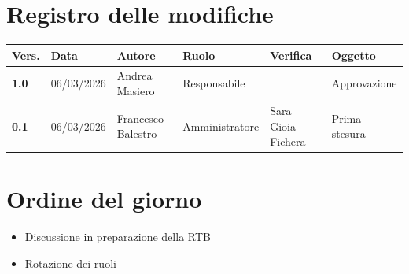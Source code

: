 \documentclass[a4paper,12pt]{article}
\begin{document}
    

    \newpage
    \section*{Registro delle modifiche}

    \begin{table}[h!]
        \begin{tabularx}{\textwidth}{|l|l|l|l|X|X|}
            \hline
            \textbf{Vers.} & \textbf{Data} & \textbf{Autore} & \textbf{Ruolo} & \textbf{Verifica} & \textbf{Oggetto} \\
            \hline
            \textbf{1.0} & 06/03/2026 & Andrea Masiero & Responsabile &  & Approvazione \\
            \hline
            \textbf{0.1} & 06/03/2026 & Francesco Balestro & Amministratore & Sara Gioia Fichera & Prima stesura \\
        \hline
        \end{tabularx}
    \end{table}

    \newpage
    \tableofcontents
    \newpage

    \section{Ordine del giorno} {
        \begin{itemize}
            \item Discussione in preparazione della RTB
            \item Rotazione dei ruoli
        \end{itemize}
    }
\end{document}
